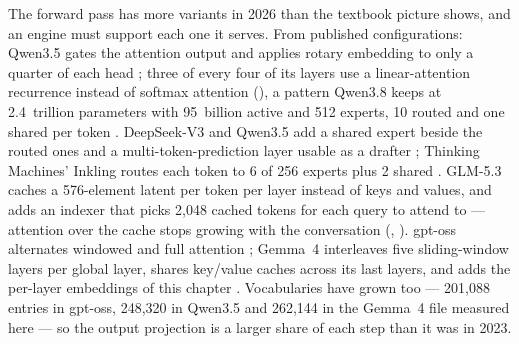 The forward pass has more variants in 2026 than the textbook picture shows, and
an engine must support each one it serves. From published configurations:
Qwen3.5 gates the attention output and applies rotary embedding to only a
quarter of each head \cite{qwen2026qwen35config}; three of every four of its
layers use a linear-attention recurrence instead of softmax attention
(), a pattern Qwen3.8 keeps at 2.4~trillion parameters
with 95~billion active and 512 experts, 10 routed and one shared per token
\cite{qwen2026qwen38}. DeepSeek-V3 and Qwen3.5 add a shared expert beside the
routed ones and a multi-token-prediction layer usable as a drafter
\cite{deepseek2024v3,qwen2026qwen35config}; Thinking Machines' Inkling routes
each token to 6 of 256 experts plus 2 shared \cite{thinkingmachines2026inkling}.
GLM-5.3 caches a 576-element latent per token per layer instead of keys and
values, and adds an indexer that picks 2,048 cached tokens for each query to
attend to \cite{zai2026glm53} --- attention over the cache stops growing with
the conversation (, ). gpt-oss
alternates windowed and full attention \cite{openai2025gptoss}; Gemma~4
interleaves five sliding-window layers per global layer, shares key/value
caches across its last layers, and adds the per-layer embeddings of this
chapter \cite{google2026gemma4}. Vocabularies have grown too --- 201,088
entries in gpt-oss, 248,320 in Qwen3.5 and 262,144 in the Gemma~4 file measured
here --- so the output projection is a larger share of each step than it was in
2023.

\ExercisesSection

